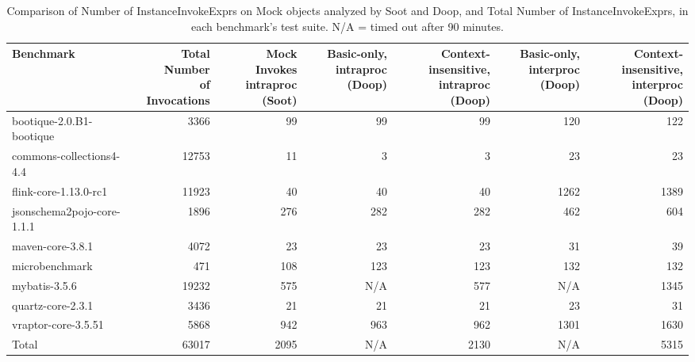 \begin{table*}
	\centering
	\caption{Comparison of Number of InstanceInvokeExprs on Mock objects analyzed by Soot and Doop, and Total Number of InstanceInvokeExprs, in each benchmark's test suite. N/A = timed out after 90 minutes.}
	\begin{tabular}{lrrrrrr}
		\toprule
		Benchmark & \thead{Total Number \\ of Invocations} & \thead{Mock Invokes \\ intraproc (Soot)} & \thead{Basic-only, \\ intraproc (Doop)} & \thead{Context-insensitive, \\ intraproc (Doop)} & \thead{Basic-only, \\ interproc (Doop)} & \thead{Context-insensitive, \\ interproc (Doop)} \\
		\midrule
		bootique-2.0.B1-bootique           		&  3366     &  99   & 99    & 99   & 120   & 122    \\
		commons-collections4-4.4       			&  12753    &  11   & 3     &  3    & 23   & 23   \\
		flink-core-1.13.0-rc1           		&  11923    &  40   & 40    & 40   & 1262  & 1389   \\
		jsonschema2pojo-core-1.1.1           	&  1896     &  276  & 282   & 282  & 462   & 604   \\
		maven-core-3.8.1           				&  4072     &  23   & 23    & 23  & 31     & 39  \\
		microbenchmark         		  			&  471      &  108  & 123   & 123  & 132   & 132   \\
		mybatis-3.5.6         		  			&  19232    &  575  & N/A   & 577 &  N/A   & 1345     \\
		quartz-core-2.3.1       	  			&  3436     &  21   & 21    & 21   & 23    & 31    \\
		vraptor-core-3.5.51        	  			&  5868     &  942  & 963   & 962  & 1301  & 1630   \\
		\bottomrule
		Total        	  						&  63017    & 2095  & N/A   & 2130  & N/A  & 5315   \\
	\end{tabular}
	\label{tab:invokes}
\end{table*}

